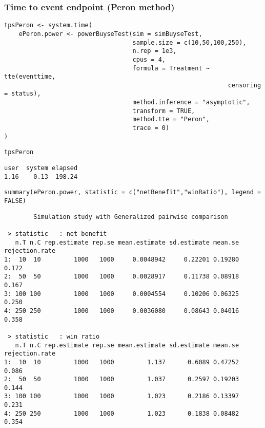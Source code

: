 \documentclass[12pt]{article}
\begin{document}
\clearpage

\subsubsection{Time to event endpoint (Peron method)}
\label{sec:orgf482983}
\lstset{language=r,label= ,caption= ,captionpos=b,numbers=none}
\begin{lstlisting}
tpsPeron <- system.time(
	ePeron.power <- powerBuyseTest(sim = simBuyseTest, 
								   sample.size = c(10,50,100,250), 
								   n.rep = 1e3,
								   cpus = 4,
								   formula = Treatment ~ tte(eventtime, 
															 censoring = status), 
								   method.inference = "asymptotic",
								   transform = TRUE,
								   method.tte = "Peron",
								   trace = 0)
)
\end{lstlisting}

\lstset{language=r,label= ,caption= ,captionpos=b,numbers=none}
\begin{lstlisting}
tpsPeron
\end{lstlisting}

\begin{verbatim}
user  system elapsed 
1.16    0.13  198.24
\end{verbatim}

\lstset{language=r,label= ,caption= ,captionpos=b,numbers=none}
\begin{lstlisting}
summary(ePeron.power, statistic = c("netBenefit","winRatio"), legend = FALSE)
\end{lstlisting}

\begin{verbatim}
        Simulation study with Generalized pairwise comparison

 > statistic   : net benefit
   n.T n.C rep.estimate rep.se mean.estimate sd.estimate mean.se rejection.rate
1:  10  10         1000   1000     0.0048942     0.22201 0.19280          0.172
2:  50  50         1000   1000     0.0028917     0.11738 0.08918          0.167
3: 100 100         1000   1000     0.0004554     0.10206 0.06325          0.250
4: 250 250         1000   1000     0.0036080     0.08643 0.04016          0.358

 > statistic   : win ratio
   n.T n.C rep.estimate rep.se mean.estimate sd.estimate mean.se rejection.rate
1:  10  10         1000   1000         1.137      0.6089 0.47252          0.086
2:  50  50         1000   1000         1.037      0.2597 0.19203          0.144
3: 100 100         1000   1000         1.023      0.2186 0.13397          0.231
4: 250 250         1000   1000         1.023      0.1838 0.08482          0.354
\end{verbatim}
\end{document}
